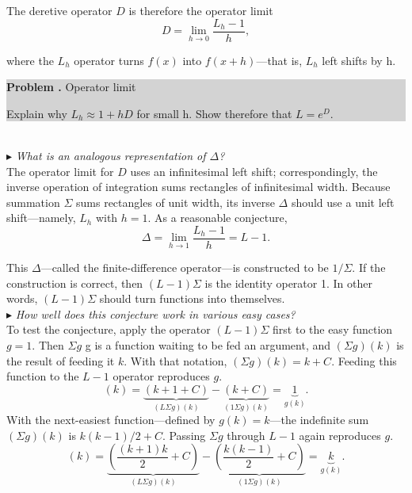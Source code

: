 \documentclass[fleqn]{book}
\newcounter{problem1}
\newcommand{\problem}{\par\addtocounter{problem1}{1}%
\textbf{Problem \arabic{chapter}.\arabic{problem1} }\quad}
\begin{document}
\noindent The deretive operator $D$ is therefore the operator limit
\begin{equation}
D=\lim_{h\rightarrow 0}\frac{L_h-1}{h}, 
\end{equation}

where the $L_h$ operator turns $f(x)$ into $f(x+h)$---that is, $L_h$ left  shifts by h.\\

\colorbox{lightgray}{
\begin{minipage}{\textwidth}
\hangindent=3cm \large{{\bf \problem Operator limit}}
\vspace{0.1cm}

\large{Explain why $L_h\approx1+hD$ for small h. Show therefore that $L=e^D$}.
\end{minipage}}\\

\noindent \large $\blacktriangleright$ \textit{What is an analogous representation of $\Delta$?} \\

\Large \noindent The operator limit for $D$ uses an infinitesimal left shift; correspondingly,
the inverse operation of integration sums rectangles of infinitesimal width.
Because summation $\Sigma$ sums rectangles of unit width, its inverse $\Delta$ should
use a unit left shift—namely, $L_h$ with $h = 1$. As a reasonable conjecture,
\begin{equation}
\Delta=\lim_{h\rightarrow 1}\frac{L_h-1}{h}=L-1. 
\end{equation}

\noindent This $\Delta$---called the finite-difference operator—is constructed to be $1/\Sigma$. If the construction is correct, then $(L-1)\Sigma$ is the identity operator 1. In other words, $(L-1)\Sigma$ should turn functions into themselves.\\

\noindent \large $\blacktriangleright$ \textit{How well does this conjecture work in various easy cases?} \\

\Large \noindent To test the conjecture, apply the operator $(L-1)\Sigma$ first to the easy function $g = 1$. Then $\Sigma g$ g is a function waiting to be fed an argument, and $(\Sigma g)(k)$ is the result of feeding it $k$. With that notation, $(\Sigma g)(k)=k+C$. Feeding
this function to the $L−1$ operator reproduces $g$.
\begin{equation}
[(L-1)\Sigma g](k)=\underbrace{(k+1+C)}_{(L\Sigma g)(k)}-\underbrace{(k+C)}_{(1\Sigma g)(k)}=\underbrace{1}_{g(k)}.
\end{equation} \vspace{0.001cm}
With the next-easiest function—defined by $g(k)=k$---the indefinite sum $(\Sigma g)(k)$ is $k(k-1)/2+C$. Passing $\Sigma g$ through $L-1$ again reproduces $g$.
\begin{equation}
[(L-1)\Sigma g](k)=\underbrace{(\frac{(k+1)k}{2}+C)}_{(L\Sigma g)(k)}-\underbrace{(\frac{k(k-1)}{2}+C)}_{(1\Sigma g)(k)}=\underbrace{k}_{g(k)}. 
\end{equation} 
\end{document}
